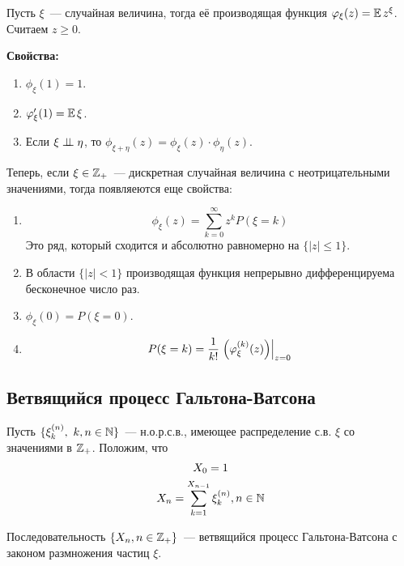 \begin{definition} 
Пусть $\xi$~--- случайная величина, тогда её производящая функция $\varphi_{\xi}(z) = \operatorname{\mathbb{E}} z^{\xi}$. Считаем $z \geq 0$.
\end{definition}

\textbf{Свойства:}
\begin{enumerate}
    \item $\phi_{\xi}(1) = 1$.
    \item $\varphi_{\xi}'(1) = \operatorname{\mathbb{E}}\xi$.
    \item Если $\xi \perp \!\!\! \perp \eta$, то $\phi_{\xi + \eta}(z) = \phi_{\xi}(z) \cdot \phi_{\eta}(z)$.
\end{enumerate}

Теперь, если $\xi \in \mathbb{Z}_+$~--- дискретная случайная величина с неотрицательными значениями, тогда появляеются еще свойства:
\begin{enumerate}
    \item[4.] 
    \begin{equation*}
        \phi_{\xi}(z) = \sum\limits_{k = 0}^\infty z^k P(\xi = k)
    \end{equation*}
    Это ряд, который сходится и абсолютно равномерно на $\{|z| \leq 1\}$.
    \item[5.] В области $\{|z| < 1\}$ производящая функция непрерывно дифференцируема бесконечное число раз.
    \item[6.] $\phi_{\xi}(0) = P(\xi = 0)$.
    \item[7.]
    \begin{equation*}
        P(\xi = k) = \frac{1}{k!} \left.\left({\varphi_{\xi}^{(k)}(z)}\right)\right\vert_{z = 0}
    \end{equation*}
\end{enumerate}

\subsection*{Ветвящийся процесс Гальтона-Ватсона}

Пусть $\{\xi_k^{(n)}, \ k, n \in \mathbb{N}\}$~--- н.о.р.с.в., имеющее распределение с.в. $\xi$ со значениями в $\mathbb{Z}_+$. Положим, что
\begin{gather*}
    X_0 = 1 \\
    X_n = \sum\limits_{k = 1}^{X_{n - 1}} \xi_k^{(n)}, n \in \mathbb{N}
\end{gather*}

\begin{definition}
Последовательность $\{X_n, n \in \mathbb{Z}_+\}$~--- ветвящийся процесс Гальтона-Ватсона с законом размножения частиц $\xi$. 
\end{definition}


